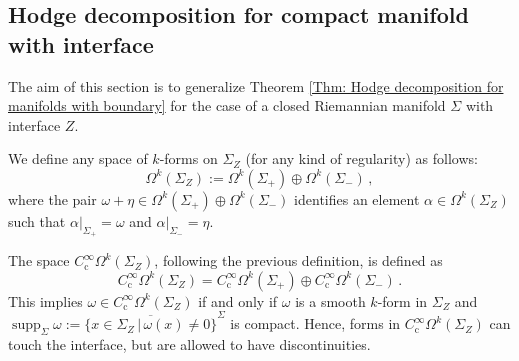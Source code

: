 \subsection{Hodge decomposition for compact manifold with interface}
The aim of this section is to generalize Theorem \ref{Thm: Hodge decomposition for manifolds with boundary} for the case of a closed Riemannian manifold $\Sigma$ with interface $Z$.
\begin{Definition}
	We define any space of $k$-forms on $\Sigma_Z$ (for any kind of regularity) as follows:
	\begin{equation}\label{Eqn: splitting of k-forms with interface}
		\Omega^k(\Sigma_Z):=\Omega^k(\Sigma_+)\oplus\Omega^k(\Sigma_-)\,,
	\end{equation}
	where the pair $\omega+\eta\in\Omega^k(\Sigma_+)\oplus\Omega^k(\Sigma_-)$ identifies an element $\alpha\in\Omega^k(\Sigma_Z)$ such that $\alpha|_{\Sigma_+}=\omega$ and $\alpha|_{\Sigma_-}=\eta$.
\end{Definition}

\begin{remark}
	The space $C^\infty_\mathrm{c}\Omega^k(\Sigma_Z)$, following the previous definition, is defined as
	\begin{equation}
		C^\infty_\mathrm{c}\Omega^k(\Sigma_Z)=C^\infty_\mathrm{c}\Omega^k(\Sigma_+)\oplus C^\infty_\mathrm{c}\Omega^k(\Sigma_-)\,.
	\end{equation}
	 This implies $\omega\in C^\infty_\mathrm{c}\Omega^k(\Sigma_Z)$ if and only if $\omega$ is a smooth $k$-form in $\Sigma_Z$ and $\operatorname{supp}_\Sigma \omega:=\overline{\{x\in\Sigma_Z\,|\, \omega(x)\neq 0\}}^\Sigma$  is compact. Hence, forms in $C^\infty_\mathrm{c}\Omega^k(\Sigma_Z)$ can touch the interface, but are allowed to have discontinuities.
\end{remark}

